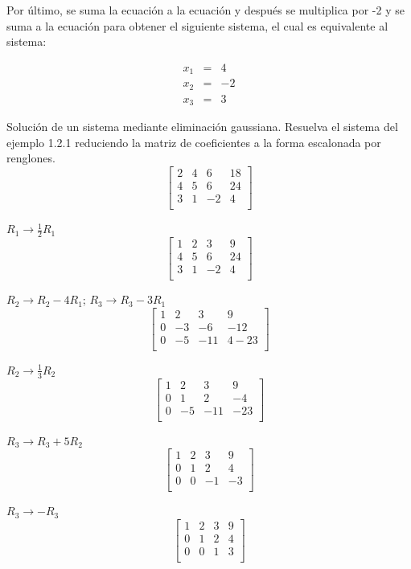 \documentclass{plantillauft}
\begin{document}
Por último, se suma la ecuación a la ecuación y después se multiplica por -2 y se suma a la ecuación para obtener el siguiente sistema, el cual es equivalente al sistema:

\begin{center}
\begin{eqnarray}
x_1 &=& 4 \nonumber \\
x_2 &=& -2 \nonumber \\
x_3 &=& 3 \nonumber
\end{eqnarray}
\end{center}

Solución de un sistema mediante eliminación gaussiana.
Resuelva el sistema del ejemplo 1.2.1 reduciendo la matriz de coeficientes a la forma escalonada por renglones.
\[
\left[
\begin{array}{ccc|c}
2 & 4 & 6 & 18 \\
4 & 5 & 6 & 24 \\
3 & 1 & -2 & 4 \\
\end{array}
\right]
\]

\begin{center}
\( R_1 \to \frac{1}{2}R_1 \)
\[
\left[
\begin{array}{ccc|c}
1 & 2 & 3 & 9 \\
4 & 5 & 6 & 24 \\
3 & 1 & -2 & 4 \\
\end{array}
\right]
\]

\( R_2 \to R_2-4R_1 \);
\( R_3 \to R_3-3R_1 \)
\[
\left[
\begin{array}{ccc|c}
1 & 2 & 3 & 9 \\
0 & -3 & -6 & -12 \\
0 & -5 & -11 & 4-23 \\
\end{array}
\right]
\]

\( R_2 \to \frac{1}{3}R_2 \)
\[
\left[
\begin{array}{ccc|c}
1 & 2 & 3 & 9 \\
0 & 1 & 2 & -4\\
0 & -5 & -11 & -23 \\
\end{array}
\right]
\]

\( R_3 \to R_3 + 5R_2 \)
\[
\left[
\begin{array}{ccc|c}
1 & 2 & 3 & 9 \\
0 & 1 & 2 & 4\\
0 & 0 & -1 & -3 \\
\end{array}
\right]
\]

\( R_3 \to - R_3\)
\[
\left[
\begin{array}{ccc|c}
1 & 2 & 3 & 9 \\
0 & 1 & 2 & 4\\
0 & 0 & 1 & 3 \\
\end{array}
\right]
\]
\end{center}
\end{document}

